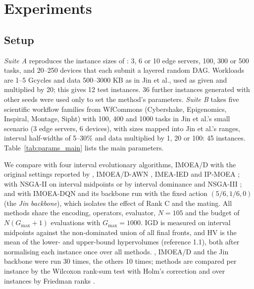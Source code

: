 \section{Experiments}
\label{sec:experiments}

\subsection{Setup}
\label{sec:setup}
\emph{Suite A} reproduces the instance sizes of \citet{jin2026imoeadqn}: 3, 6 or 10 edge servers, 100, 300 or 500 tasks,
and 20--250 devices that each submit a layered random DAG. Workloads are 1--5 Gcycles and data 500--3000 KB as in Jin et
al., used as given and multiplied by 20; this gives 12 test instances. 36 further instances generated with other seeds
were used only to set the method's parameters. \emph{Suite B} takes five scientific workflow families from WfCommons
\citep{coleman2022wfcommons} (Cybershake, Epigenomics, Inspiral, Montage, Sipht) with 100, 400 and 1000 tasks in Jin et
al.'s small scenario (3 edge servers, 6 devices), with sizes mapped into Jin et al.'s ranges, interval half-widths of
5--30\% and data multiplied by 1, 20 or 100: 45 instances. Table~\ref{tab:params_main} lists the main parameters.



We compare \ours{} with four interval evolutionary algorithms, IMOEA/D with the original settings reported by
\citet{cui2024imeaied}, IMOEA/D-AWN \citep{jin2023imoeadawn}, IMEA-IED \citep{cui2024imeaied} and IP-MOEA
\citep{limbourg2005ipmoea}; with NSGA-II \citep{deb2002nsga2} on interval midpoints or by interval dominance and NSGA-III
\citep{deb2014nsga3}; and with IMOEA-DQN \citep{jin2026imoeadqn} and its backbone run with the fixed action
$(5/6, 1/6, 0)$ (the \emph{Jin backbone}), which isolates the effect of Rank C and the mating. All methods share the
encoding, operators, evaluator, $N = 105$ and the budget of $N(G_{\max}+1)$ evaluations with $G_{\max} = 1000$.
IGD is measured on interval midpoints against the non-dominated union of all final fronts, and HV is the mean of the
lower- and upper-bound hypervolumes (reference 1.1), both after normalising each instance once over all methods.
\ours{}, IMOEA/D and the Jin backbone were run 30 times, the others 10 times; methods are compared per instance by the
Wilcoxon rank-sum test with Holm's correction \citep{holm1979} and over instances by Friedman ranks \citep{demsar2006}.


